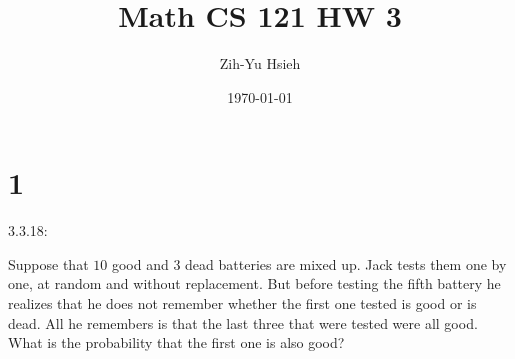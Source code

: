 \documentclass{article}
\title{Math CS 121 HW 3}
\author{Zih-Yu Hsieh}
\date{\today}
\begin{document}
\maketitle

\section*{1}
\begin{ques}\label{q1}
    3.3.18:

    Suppose that $10$ good and $3$ dead batteries are mixed up. Jack tests them one by one, at random and without replacement. But before testing the fifth battery he realizes that he does not remember whether the first one tested is good or is dead. All he remembers is that the last three that were tested were all good. What is the probability that the first one is also good?
\end{ques}
\end{document}
